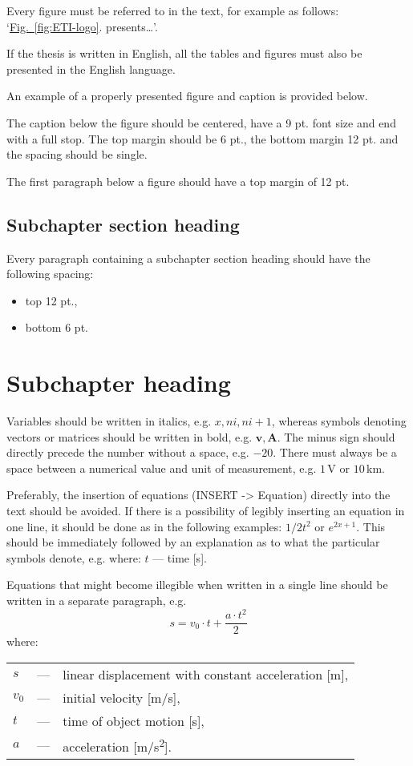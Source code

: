 Every figure must be referred to in the text, for example as follows: `\hyperref[fig:ETI-logo]{Fig.~\ref*{fig:ETI-logo}}. presents\ldots'.

If the thesis is written in English, all the tables and figures must also be presented in the English language.

An example of a properly presented figure and caption is provided below.

The caption below the figure should be centered, have a 9 pt. font size and end with a full stop. The top margin should be 6 pt., the bottom margin 12 pt. and the spacing should be single.

The first paragraph below a figure should have a top margin of 12 pt.



\subsection{Subchapter section heading}

Every paragraph containing a subchapter section heading should have the following spacing:
\begin{itemize}
	\item top 12 pt.,
	\item bottom 6 pt.
\end{itemize}



\section{Subchapter heading}

Variables should be written in italics, e.g. $x, ni, ni+1$, whereas symbols denoting vectors or matrices should be written in bold, e.g. $\mathbf{v}, \mathbf{A}$. The minus sign should directly precede the number without a space, e.g. $-20$. There must always be a space between a numerical value and unit of measurement, e.g. $1\,\mathrm{V}$ or $10\,\mathrm{km}$.

Preferably, the insertion of equations (INSERT -\textgreater{} Equation) directly into the text should be avoided. If there is a possibility of legibly inserting an equation in one line, it should be done as in the following examples: $1/2t^2$ or $e^{2x+1}$. This should be immediately followed by an explanation as to what the particular symbols denote, e.g. where: $t$ --– time [s].

Equations that might become illegible when written in a single line should be written in a separate paragraph, e.g.
\begin{equation}
	\label{eq:exemplary-equation}
	s = v_0 \cdot t + \frac{a \cdot t^2}{2}
\end{equation}
where: \\
\begin{tabularx}{\textwidth}{p{1.25cm}p{0.5cm}X}
	$s$		& ---	& linear displacement with constant acceleration [m], \\
	$v_0$ 	& ---	& initial velocity [m/s], \\
	$t$		& ---	& time of object motion [s], \\
	$a$		& ---	& acceleration [m/s\textsuperscript{2}].
\end{tabularx}

